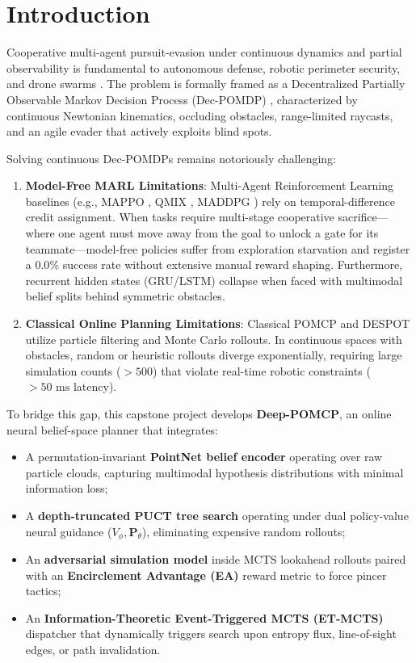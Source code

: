 \documentclass[conference]{IEEEtran}
\begin{document}
\section{Introduction}
Cooperative multi-agent pursuit-evasion under continuous dynamics and partial observability is fundamental to autonomous defense, robotic perimeter security, and drone swarms \cite{guibas1999visibility, isler2005randomized, pierson2017intercepting}. The problem is formally framed as a Decentralized Partially Observable Markov Decision Process (Dec-POMDP) \cite{oliehoek2016concise}, characterized by continuous Newtonian kinematics, occluding obstacles, range-limited raycasts, and an agile evader that actively exploits blind spots.

Solving continuous Dec-POMDPs remains notoriously challenging:
\begin{enumerate}
    \item \textbf{Model-Free MARL Limitations}: Multi-Agent Reinforcement Learning baselines (e.g., MAPPO \cite{yu2022surprising}, QMIX \cite{rashid2018qmix}, MADDPG \cite{lowe2017multi}) rely on temporal-difference credit assignment. When tasks require multi-stage cooperative sacrifice---where one agent must move away from the goal to unlock a gate for its teammate---model-free policies suffer from exploration starvation and register a $0.0\%$ success rate without extensive manual reward shaping. Furthermore, recurrent hidden states (GRU/LSTM) collapse when faced with multimodal belief splits behind symmetric obstacles.
    \item \textbf{Classical Online Planning Limitations}: Classical POMCP \cite{silver2010monte} and DESPOT \cite{somani2013despot} utilize particle filtering and Monte Carlo rollouts. In continuous spaces with obstacles, random or heuristic rollouts diverge exponentially, requiring large simulation counts ($>500$) that violate real-time robotic constraints ($>50\text{ ms}$ latency).
\end{enumerate}

To bridge this gap, this capstone project develops \textbf{Deep-POMCP}, an online neural belief-space planner that integrates:
\begin{itemize}
    \item A permutation-invariant \textbf{PointNet belief encoder} operating over raw particle clouds, capturing multimodal hypothesis distributions with minimal information loss;
    \item A \textbf{depth-truncated PUCT tree search} operating under dual policy-value neural guidance ($V_\phi, \mathbf{P}_\theta$), eliminating expensive random rollouts;
    \item An \textbf{adversarial simulation model} inside MCTS lookahead rollouts paired with an \textbf{Encirclement Advantage (EA)} reward metric to force pincer tactics;
    \item An \textbf{Information-Theoretic Event-Triggered MCTS (ET-MCTS)} dispatcher that dynamically triggers search upon entropy flux, line-of-sight edges, or path invalidation.
\end{itemize}
\end{document}
